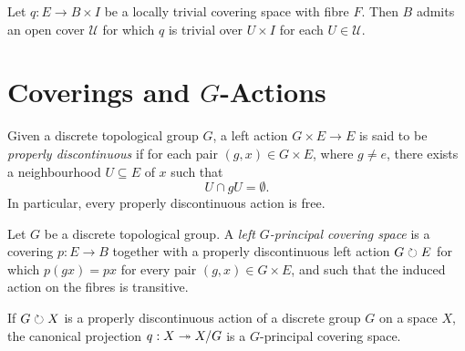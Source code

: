 \begin{proposition}
    Let \(q: E \to B \times I\) be a locally trivial covering space with
    fibre \(F\). Then \(B\) admits an open cover \(\mathcal{U}\) for which \(q\) is
    trivial over \(U \times I\) for each \(U \in \mathcal{U}\).
\end{proposition}



\section{Coverings and \texorpdfstring{\(G\)}{G}-Actions}

\begin{definition}
    \label{def:properly-discontinuous-action}
    Given a discrete topological group \(G\), a left action \(G \times E \to E\) is
    said to be \emph{properly discontinuous} if for each pair
    \((g, x) \in G \times E\), where \(g \neq e\), there exists a neighbourhood
    \(U \subseteq E\) of \(x\) such that
    \[
        U \cap g U = \emptyset.
    \]
    In particular, every properly discontinuous action is free.
\end{definition}

\begin{definition}
    \label{def:G-principal-covering}
    Let \(G\) be a discrete topological group. A \emph{left \(G\)-principal covering
        space} is a covering \(p: E \to B\) together with a properly discontinuous
    left action \(G \circlearrowright E\) for which \(p(g x) = p x\) for every pair
    \((g, x) \in G \times E\), and such that the induced action on the fibres is
    transitive.
\end{definition}

\begin{proposition}
    \label{prop:properly-discontinuous-induces-covering}
    If \(G \circlearrowright X\) is a properly discontinuous action of a discrete group \(G\)
    on a space \(X\), the canonical projection \(q: X \twoheadrightarrow X/G\) is a
    \(G\)-principal covering space.
\end{proposition}

